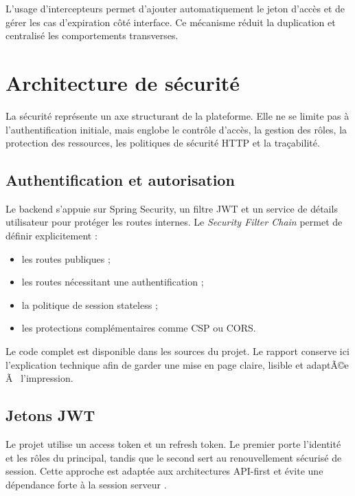 ﻿\documentclass[12pt,a4paper,oneside]{report}
\newenvironment{codeblock}[1][]{
  \par
  \captionsetup{type=figure}
}{
  \par
}
\begin{document}
L'usage d'intercepteurs permet d'ajouter automatiquement le jeton d'accès et de gérer les cas d'expiration côté interface. Ce mécanisme réduit la duplication et centralisé les comportements transverses.

\section{Architecture de sécurité}
La sécurité représente un axe structurant de la plateforme. Elle ne se limite pas à l'authentification initiale, mais englobe le contrôle d'accès, la gestion des rôles, la protection des ressources, les politiques de sécurité HTTP et la traçabilité.

\subsection{Authentification et autorisation}
Le backend s'appuie sur Spring Security, un filtre JWT et un service de détails utilisateur pour protéger les routes internes. Le \textit{Security Filter Chain} permet de définir explicitement :
\begin{itemize}
  \item les routes publiques ;
  \item les routes nécessitant une authentification ;
  \item la politique de session stateless ;
  \item les protections complémentaires comme CSP ou CORS.
\end{itemize}

\begin{codeblock}[H]
\caption{Configuration de sécurité du backend}
\begin{keybox}
Le code complet est disponible dans les sources du projet. Le rapport conserve ici l'explication technique afin de garder une mise en page claire, lisible et adaptÃ©e Ã  l'impression.
\end{keybox}
\end{codeblock}

\subsection{Jetons JWT}
Le projet utilise un access token et un refresh token. Le premier porte l'identité et les rôles du principal, tandis que le second sert au renouvellement sécurisé de session. Cette approche est adaptée aux architectures API-first et évite une dépendance forte à la session serveur \cite{owasp2021}.
\end{document}
